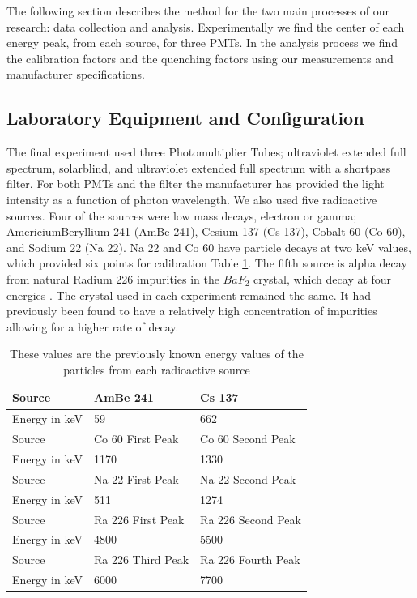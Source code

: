 \documentclass[aip, jmp, amsmath, amssymb, reprint, floatfix]{revtex4-1}
\begin{document}
The following section describes the method for the two main processes of our research: data collection and analysis. Experimentally we find the center of each energy peak, from each source, for three PMTs. In the analysis process we find the calibration factors and the quenching factors using our measurements and manufacturer specifications. 

\subsection{\label{sec:level2}Laboratory Equipment and Configuration}

The final experiment used three Photomultiplier Tubes; ultraviolet extended full spectrum, solarblind, and ultraviolet extended full spectrum with a shortpass filter. For both PMTs and the filter the manufacturer has provided the light intensity as a function of photon wavelength. We also used five radioactive sources. Four of the sources were low mass decays, electron or gamma; AmericiumBeryllium 241 (AmBe 241), Cesium 137 (Cs 137), Cobalt 60 (Co 60), and Sodium 22 (Na 22). Na 22 and Co 60 have particle decays at two keV values, which provided six points for calibration Table \ref{table:knownvalues}. The fifth source is alpha decay from natural Radium 226 impurities in the $BaF_2$ crystal, which decay at four energies \cite{Ra226}. The crystal used in each experiment remained the same. It had previously been found to have a relatively high concentration of impurities allowing for a higher rate of decay. 


\begin{table}[h]
    \begin{tabular}{ | l | l | p{2cm} |}
    \hline
    Source & AmBe 241 & Cs 137 \\ \hline

    Energy in keV & 59 & 662 \\ \hline  

    Source & Co 60 First Peak & Co 60 Second Peak  \\ \hline

    Energy in keV & 1170 & 1330 \\ \hline

    Source & Na 22 First Peak & Na 22 Second Peak \\ \hline

    Energy in keV & 511 & 1274 \\ \hline

    Source & Ra 226 First Peak & Ra 226 Second Peak \\ \hline

    Energy in keV & 4800 & 5500 \\ \hline

    Source & Ra 226 Third Peak & Ra 226 Fourth Peak \\ \hline

    Energy in keV & 6000 & 7700 \\ \hline
    \hline
    \end{tabular}
  \caption{These values are the previously known energy values of the particles from each radioactive source}
  \label{table:knownvalues}
\end{table}
\end{document}

